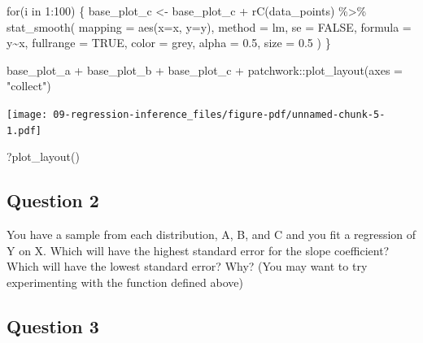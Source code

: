 \documentclass[
  letterpaper,
  DIV=11,
  numbers=noendperiod]{scrreprt}
\newenvironment{Shaded}{\begin{snugshade}}{\end{snugshade}}
\newcommand{\AttributeTok}[1]{\textcolor[rgb]{0.40,0.45,0.13}{#1}}
\newcommand{\ConstantTok}[1]{\textcolor[rgb]{0.56,0.35,0.01}{#1}}
\newcommand{\ControlFlowTok}[1]{\textcolor[rgb]{0.00,0.23,0.31}{#1}}
\newcommand{\DecValTok}[1]{\textcolor[rgb]{0.68,0.00,0.00}{#1}}
\newcommand{\FloatTok}[1]{\textcolor[rgb]{0.68,0.00,0.00}{#1}}
\newcommand{\FunctionTok}[1]{\textcolor[rgb]{0.28,0.35,0.67}{#1}}
\newcommand{\NormalTok}[1]{\textcolor[rgb]{0.00,0.23,0.31}{#1}}
\newcommand{\OtherTok}[1]{\textcolor[rgb]{0.00,0.23,0.31}{#1}}
\newcommand{\SpecialCharTok}[1]{\textcolor[rgb]{0.37,0.37,0.37}{#1}}
\newcommand{\StringTok}[1]{\textcolor[rgb]{0.13,0.47,0.30}{#1}}
\begin{document}
\begin{Shaded}
\begin{Highlighting}[]
\ControlFlowTok{for}\NormalTok{(i }\ControlFlowTok{in} \DecValTok{1}\SpecialCharTok{:}\DecValTok{100}\NormalTok{) \{ }
\NormalTok{    base\_plot\_c }\OtherTok{\textless{}{-}}\NormalTok{ base\_plot\_c }\SpecialCharTok{+} \FunctionTok{rC}\NormalTok{(data\_points) }\SpecialCharTok{\%\textgreater{}\%} 
      \FunctionTok{stat\_smooth}\NormalTok{(}
        \AttributeTok{mapping =} \FunctionTok{aes}\NormalTok{(}\AttributeTok{x=}\NormalTok{x, }\AttributeTok{y=}\NormalTok{y), }
        \AttributeTok{method  =} \StringTok{\textquotesingle{}lm\textquotesingle{}}\NormalTok{,         }\AttributeTok{se =} \ConstantTok{FALSE}\NormalTok{, }
        \AttributeTok{formula =} \StringTok{\textquotesingle{}y\textasciitilde{}x\textquotesingle{}}\NormalTok{, }\AttributeTok{fullrange =} \ConstantTok{TRUE}\NormalTok{,}
        \AttributeTok{color   =} \StringTok{\textquotesingle{}grey\textquotesingle{}}\NormalTok{,    }\AttributeTok{alpha =} \FloatTok{0.5}\NormalTok{,}
        \AttributeTok{size    =} \FloatTok{0.5}
\NormalTok{      )}
\NormalTok{\}}

\NormalTok{base\_plot\_a }\SpecialCharTok{+}\NormalTok{ base\_plot\_b }\SpecialCharTok{+}\NormalTok{ base\_plot\_c }\SpecialCharTok{+}\NormalTok{ patchwork}\SpecialCharTok{::}\FunctionTok{plot\_layout}\NormalTok{(}\AttributeTok{axes =} \StringTok{"collect"}\NormalTok{)}
\end{Highlighting}
\end{Shaded}

\texttt{[image: 09-regression-inference\_files/figure-pdf/unnamed-chunk-5-1.pdf]}

\begin{Shaded}
\begin{Highlighting}[]
\NormalTok{?}\FunctionTok{plot\_layout}\NormalTok{()}
\end{Highlighting}
\end{Shaded}

\subsection{Question 2}\label{question-2}

You have a sample from each distribution, A, B, and C and you fit a
regression of Y on X. Which will have the highest standard error for the
slope coefficient? Which will have the lowest standard error? Why? (You
may want to try experimenting with the function defined above)

\subsection{Question 3}\label{question-3}
\end{document}
